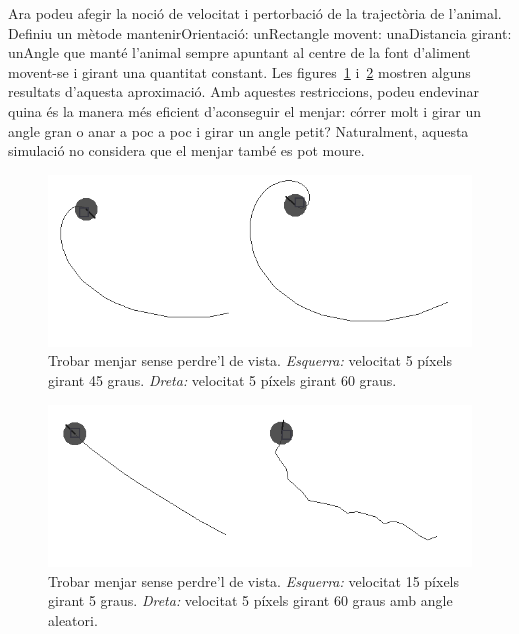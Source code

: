 Ara podeu afegir la noció de velocitat i pertorbació de la trajectòria de l'animal. Definiu un mètode \textsf{mantenirOrientació: unRectangle movent: unaDistancia girant: unAngle} que manté l'animal sempre apuntant al centre de la font d'aliment movent-se i girant una quantitat constant. Les figures~\ref{fig2313} i~\ref{fig2314} mostren alguns resultats d'aquesta aproximació. Amb aquestes restriccions, podeu endevinar quina és la manera més eficient d'aconseguir el menjar: córrer molt i girar un angle gran o anar a poc a poc i girar un angle petit? Naturalment, aquesta simulació no considera que el menjar també es pot moure.
\begin{figure}[h!]
\begin{center}
\includegraphics[scale=2]{Imatges/figura23-13}
\end{center}
\caption{Trobar menjar sense perdre'l de vista. \emph{Esquerra:} velocitat 5 píxels girant 45 graus. \emph{Dreta:} velocitat 5 píxels girant 60 graus.}
\label{fig2313}
\end{figure}

\begin{figure}[h!]
\begin{center}
\includegraphics[scale=2]{Imatges/figura23-14}
\end{center}
\caption{Trobar menjar sense perdre'l de vista. \emph{Esquerra:} velocitat 15 píxels girant 5 graus. \emph{Dreta:} velocitat 5 píxels girant 60 graus amb angle aleatori.}
\label{fig2314}
\end{figure}

